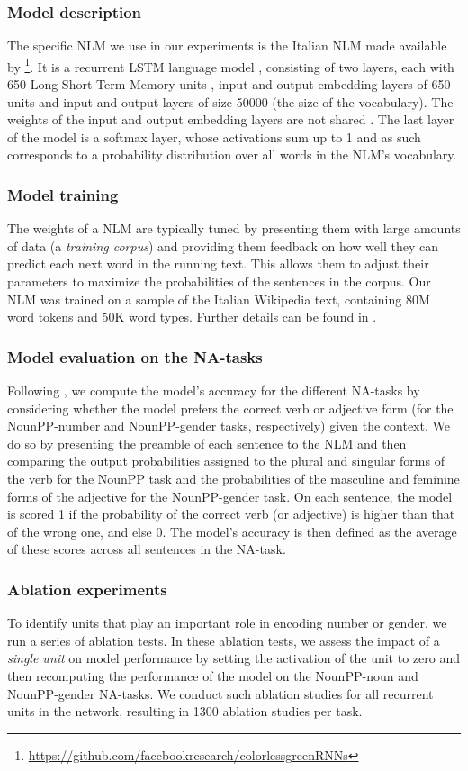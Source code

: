 \subsubsection{Model description}
The specific NLM we use in our experiments is the Italian NLM made available by \citet{Gulordava:etal:2018}\footnote{\url{https://github.com/facebookresearch/colorlessgreenRNNs}}.
It is a recurrent LSTM language model \citep{Graves:2012}, consisting of two layers, each with 650 Long-Short Term Memory units  \citep{Hochreiter:Schmidhuber:1997}, input and output embedding layers of 650 units and input and output layers of size 50000 (the size of the vocabulary). 
The weights of the input and output embedding layers are not shared \citep{press2016using}.
The last layer of the model is a softmax layer, whose activations sum up to 1 and as such corresponds to a probability distribution over all words in the NLM's vocabulary. 

\subsubsection{Model training}
The weights of a NLM are typically tuned by presenting them with large amounts of data (a \emph{training corpus}) and providing them feedback on how well they can predict each next word in the running text. This allows them to adjust their parameters to maximize the probabilities of the sentences in the corpus. %
Our NLM was trained on a sample of the Italian Wikipedia text, containing 80M word tokens and 50K word types. Further details can be found in \citet{Gulordava:etal:2018}.


\subsubsection{Model evaluation on the NA-tasks}
Following \citet{Linzen:etal:2016}, we compute the model's accuracy for the different NA-tasks by considering whether the model prefers the correct verb or adjective form (for the NounPP-number and NounPP-gender tasks, respectively) given the context. We do so by presenting the preamble of each sentence to the NLM and then comparing the output probabilities assigned to the plural and singular forms of the verb for the NounPP task and the probabilities of the masculine and feminine forms of the adjective for the NounPP-gender task. On each sentence, the model is scored 1 if the probability of the correct verb (or adjective) is higher than that of the wrong one, and else 0. 
The model's accuracy is then defined as the average of these scores across all sentences in the NA-task. 

\subsubsection{Ablation experiments}
To identify units that play an important role in encoding number or gender, we run a series of ablation tests.
In these ablation tests, we assess the impact of a \emph{single unit} on model performance by setting the activation of the unit to zero and then recomputing the performance of the model on the NounPP-noun and NounPP-gender NA-tasks. 
We conduct such ablation studies for all recurrent units in the network, resulting in 1300 ablation studies per task.